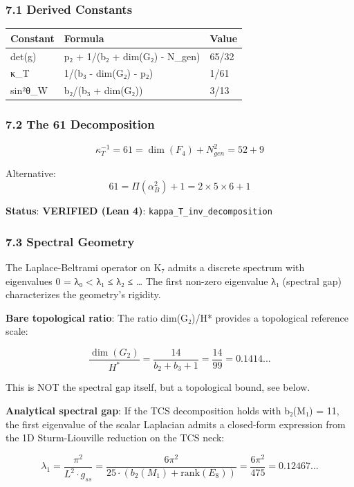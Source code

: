 \documentclass[11pt,a4paper]{article}
\begin{document}
{{{{{{{{{{{{{\subsubsection{7.1 Derived Constants}\label{derived-constants}

{\def\LTcaptype{none} %
\begin{longtable}[]{@{}lll@{}}
\toprule\noalign{}
Constant & Formula & Value \\
\midrule\noalign{}
\endhead
\bottomrule\noalign{}
\endlastfoot
det(g) & p₂ + 1/(b₂ + dim(G₂) - N\_gen) & 65/32 \\
κ\_T & 1/(b₃ - dim(G₂) - p₂) & 1/61 \\
sin²θ\_W & b₂/(b₃ + dim(G₂)) & 3/13 \\
\end{longtable}
\subsubsection{7.2 The 61 Decomposition}\label{the-61-decomposition}

\[\kappa_T^{-1} = 61 = \dim(F_4) + N_{gen}^2 = 52 + 9\]

Alternative:
\[61 = \Pi(\alpha^2_B) + 1 = 2 \times 5 \times 6 + 1\]

\textbf{Status}: \textbf{VERIFIED (Lean 4)}: \texttt{kappa\_T\_inv\_decomposition}

\subsubsection{7.3 Spectral Geometry}\label{spectral-geometry}

The Laplace-Beltrami operator on K₇ admits a discrete spectrum with eigenvalues 0 = λ₀ \textless{} λ₁ ≤ λ₂ ≤ \ldots{} The first non-zero eigenvalue λ₁ (spectral gap) characterizes the geometry's rigidity.

\textbf{Bare topological ratio}: The ratio dim(G₂)/H* provides a topological reference scale:

\[\frac{\dim(G_2)}{H^*} = \frac{14}{b_2 + b_3 + 1} = \frac{14}{99} = 0.1414...\]

This is NOT the spectral gap itself, but a topological bound, see below.

\textbf{Analytical spectral gap}: If the TCS decomposition holds with b₂(M₁) = 11, the first eigenvalue of the scalar Laplacian admits a closed-form expression from the 1D Sturm-Liouville reduction on the TCS neck:

\[\boxed{\lambda_1 = \frac{\pi^2}{L^2 \cdot g_{ss}} = \frac{6\pi^2}{25 \cdot (b_2(M_1) + \mathrm{rank}(E_8))} = \frac{6\pi^2}{475} = 0.12467...}\]

}}}}}}}}}}}}}}
\end{document}
